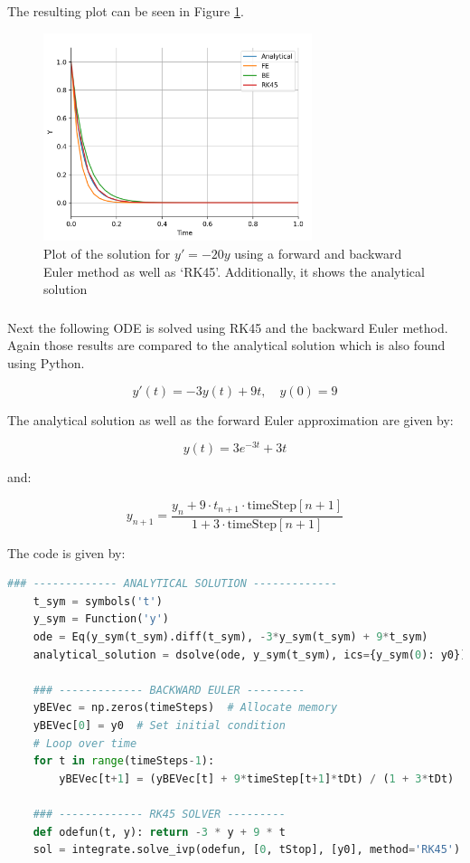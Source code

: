 \documentclass{article}
\begin{document}
    \vspace{10pt}
    The resulting plot can be seen in Figure \ref{fig:RK45}.

    \begin{figure}[h!]
        \centering
        \includegraphics[width=0.7\textwidth]{RK45.png}
        \caption{Plot of the solution for $y'=-20y$ using a forward and backward Euler method as well as ‘RK45’. Additionally, it shows the analytical solution}
        \label{fig:RK45}
    \end{figure}

    \subsubsection{}
    Next the following ODE is solved using RK45 and the backward Euler method.
    Again those results are compared to the analytical solution which is also found using Python.

    \[ y'(t) = -3y(t) + 9t, \quad y(0) = 9 \]

    The analytical solution as well as the forward Euler approximation are given by:

    \[ y(t) = 3e^{-3t} + 3t \]

    and:

    \[ y_{n+1} = \frac{y_n + 9 \cdot t_{n+1} \cdot \text{{timeStep}}[n+1]}{1 + 3 \cdot \text{{timeStep}}[n+1]} \]

    \vspace{80pt}
    The code is given by:
    \begin{lstlisting}[language=Python, style=mystyle]
    ### ------------- ANALYTICAL SOLUTION -------------
    t_sym = symbols('t')
    y_sym = Function('y')
    ode = Eq(y_sym(t_sym).diff(t_sym), -3*y_sym(t_sym) + 9*t_sym)
    analytical_solution = dsolve(ode, y_sym(t_sym), ics={y_sym(0): y0})

    ### ------------- BACKWARD EULER ---------
    yBEVec = np.zeros(timeSteps)  # Allocate memory
    yBEVec[0] = y0  # Set initial condition
    # Loop over time
    for t in range(timeSteps-1):
        yBEVec[t+1] = (yBEVec[t] + 9*timeStep[t+1]*tDt) / (1 + 3*tDt)

    ### ------------- RK45 SOLVER ---------
    def odefun(t, y): return -3 * y + 9 * t
    sol = integrate.solve_ivp(odefun, [0, tStop], [y0], method='RK45')
    \end{lstlisting}
\end{document}
